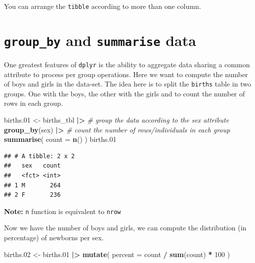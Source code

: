 \documentclass[
]{book}
\newenvironment{Shaded}{\begin{snugshade}}{\end{snugshade}}
\newcommand{\AttributeTok}[1]{\textcolor[rgb]{0.13,0.29,0.53}{#1}}
\newcommand{\CommentTok}[1]{\textcolor[rgb]{0.56,0.35,0.01}{\textit{#1}}}
\newcommand{\DecValTok}[1]{\textcolor[rgb]{0.00,0.00,0.81}{#1}}
\newcommand{\FloatTok}[1]{\textcolor[rgb]{0.00,0.00,0.81}{#1}}
\newcommand{\FunctionTok}[1]{\textcolor[rgb]{0.13,0.29,0.53}{\textbf{#1}}}
\newcommand{\NormalTok}[1]{#1}
\newcommand{\OtherTok}[1]{\textcolor[rgb]{0.56,0.35,0.01}{#1}}
\newcommand{\SpecialCharTok}[1]{\textcolor[rgb]{0.81,0.36,0.00}{\textbf{#1}}}
\begin{document}
You can arrange the \texttt{tibble} according to more than one column.

\section{\texorpdfstring{\texttt{group\_by} and \texttt{summarise} data}{group\_by and summarise data}}\label{group_by-and-summarise-data}

One greatest features of \texttt{dplyr} is the ability to aggregate data sharing a common attribute to process per group operations.
Here we want to compute the number of boys and girls in the data-set.
The idea here is to split the \texttt{births} table in two groups. One with the boys, the other with the girls and to count the number of rows in each group.

\begin{Shaded}
\begin{Highlighting}[]
\NormalTok{births}\FloatTok{.01} \OtherTok{\textless{}{-}}
\NormalTok{  births\_tbl }\SpecialCharTok{|\textgreater{}}
  \CommentTok{\# group the data according to the sex attribute}
  \FunctionTok{group\_by}\NormalTok{(sex) }\SpecialCharTok{|\textgreater{}}
  \CommentTok{\# count the number of rows/individuals in each group}
  \FunctionTok{summarise}\NormalTok{(}
    \AttributeTok{count =} \FunctionTok{n}\NormalTok{()}
\NormalTok{  )}
\NormalTok{births}\FloatTok{.01}
\end{Highlighting}
\end{Shaded}

\begin{verbatim}
## # A tibble: 2 x 2
##   sex   count
##   <fct> <int>
## 1 M       264
## 2 F       236
\end{verbatim}

\textbf{Note:} \texttt{n} function is equivalent to \texttt{nrow}

Now we have the number of boys and girls, we can compute the distribution (in percentage) of newborns per sex.

\begin{Shaded}
\begin{Highlighting}[]
\NormalTok{births}\FloatTok{.02} \OtherTok{\textless{}{-}}
\NormalTok{  births}\FloatTok{.01} \SpecialCharTok{|\textgreater{}}
  \FunctionTok{mutate}\NormalTok{(}
    \AttributeTok{percent =}\NormalTok{ count }\SpecialCharTok{/} \FunctionTok{sum}\NormalTok{(count) }\SpecialCharTok{*} \DecValTok{100}
\NormalTok{  )}
\end{Highlighting}
\end{Shaded}
\end{document}
